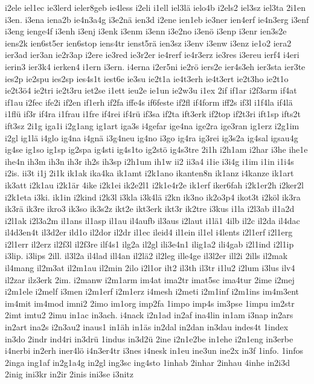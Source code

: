{i2ele
iel1ec
ie3lerd
ieler8geb
ie4less
i2eli
i1ell
iel3lä
ielo4b
i2els2
iel3sz
iel3ta
2i1en
i3en.
i3ena
iena2b
ie4n3a4g
i3e2nä
ien3d
i2ene
ien1eb
ie3ner
ien4erf
ie4n3erg
i3enf
i3eng
ienge4f
i3enh
i3enj
i3enk
i3enm
i3enn
i3e2no
i3enö
i3enp
i3enr
ien3s2e
iens2k
ien6st5er
ien6stop
iens4tr
ienst5rä
ien3sz
i3env
i3enw
i3enz
ie1o2
iera2
ier3ad
ier3an
ie2r3ap
i2ere
ie3red
ie3r2er
ie4rerf
ie4r3erz
ie3res
i3ereu
ierf4
i4eri
ierin3
ier3k4
ierken4
i1ern
i3ern.
i4erna
i2er5ni
ie2rö
iers2e
ier4s3eh
ier3sta
ier3te
ies2p
ie2spu
ies2sp
ies4s1t
iest6e
ie3su
ie2t1a
ie4t3erh
ie4t3ert
ie2t3ho
ie2t1o
ie2t3ö4
ie2tri
ie2t3ru
iet2se
i1ett
ieu2e
ie1un
ie2w3u
i1ex
2if
if1ar
i2f3arm
if4at
if1au
i2fec
ife2i
if2en
if1erh
if2fa
iffe4s
if6feste
if2fl
if4form
iff2s
if3l
i1f4la
if4lä
i1flü
if3r
if4ra
i1frau
i1fre
if4rei
if4rü
if3sa
if2ta
ift3erk
if2top
if2t3ri
ift1sp
ifts2t
ift3sz
2i1g
iga1i
i2g1ang
ig1art
iga3s
i4gefar
ige4na
ige2ra
ige3ran
ig1erz
i2g1im
i2gl
ig1lä
i4glo
ig4na
i4gnä
i3g4neu
ig4no
i3go
ig4ra
ig3rei
ig3s2a
ig4sal
igsau4g
ig4se
ig1so
ig1sp
ig2spa
ig4sti
ig4s1to
ig2stö
ig4s3tre
2i1h
i2h1am
i2har
i3he
ihe1e
ihe4n
ih3m
ih3n
ih3r
ih2s
ih3sp
i2h1um
ih1w
ii2
ii3a4
i1ie
i3i4g
i1im
i1in
i1i4s
i2is.
ii3t
i1j
2i1k
ik1ak
ika4ka
ik1amt
i2k1ano
ikanten8n
ik1anz
i4kanze
ik1art
ik3att
i2k1au
i2k1är
4ike
i2k1ei
ik2e2l1
i2k1e4r2e
ik1erf
iker6fah
i2k1er2h
i2ker2l
i2k1eta
i3ki.
ik1in
i2kind
i2k3l
i3kla
i3k4lä
i2kn
ik3no
ik2o3p4
ikot3t
i2köl
ik3ra
ik3rä
ik3re
ikro3
ik3so
ik3s2z
ikt2e
ikt3erk
ikt3r
ik2tre
i3kus
i1la
i2l3ab
il1a2d
i2l1ak
i2l3a2m
il1ans
il1asp
il1au
il4aufb
il3aus
i2laut
i1lä1
4ilb
il2c
il2da
il4dac
il4d3en4t
il3d2er
ild1o
il2dor
il2dr
il1ec
ileid4
il1ein
il1el
i4lents
i2l1erf
i2l1erg
i2l1err
il2erz
il2f3l
il2f3re
ilf4s1
ilg2a
il2gl
ili3e4n1
ilig1a2
ili4gab
i2l1ind
i2l1ip
i3lip.
i3lips
2ill.
il3l2a
il4lad
ill4an
il2lä2
il2leg
ille4ge
il3l2er
ill2i
2ills
il2mak
il4mang
il2m3at
il2m1au
il2min
2ilo
i2l1or
ilt2
il3th
il3tr
i1lu2
i2lum
i3lus
ilv4
il2zar
ilz3erk
2im.
i2manw
i2m1arm
im4at
ima2tr
imat5sc
ima4tur
2ime
i2mej
i2m1ele
i2melf
i3men
i2m1erf
i2m1erz
i4mesh
i2meti
i2m1inf
i2m1ins
im4m3ent
im4mit
im4mod
imni2
2imo
im1org
imp2fa
1impo
imp4s
im3pse
1impu
im2str
2imt
imtu2
2imu
in1ac
in3ach.
i4nack
i2n1ad
in2af
ina4lin
in1am
i3nap
in2ars
in2art
ina2s
i2n3au2
inaus1
in1äh
in1äs
in2dal
in2dan
in3dau
indes4t
1index
in3do
2indr
ind4ri
in3drü
1indus
in3d2ü
2ine
i2n1e2be
in1ehe
i2n1eng
in3erbe
i4nerbi
in2erh
iner4lö
i4n3er4tr
i3nes
i4nesk
in1eu
ine3un
ine2x
in3f
1info.
1infos
2inga
ing1af
in2g1a4g
in2gl
ing3sc
ing4sto
1inhab
2inhar
2inhau
4inhe
in2i3d
2inig
ini3kr
in2ir
2inis
ini3se
i3nitz
}
